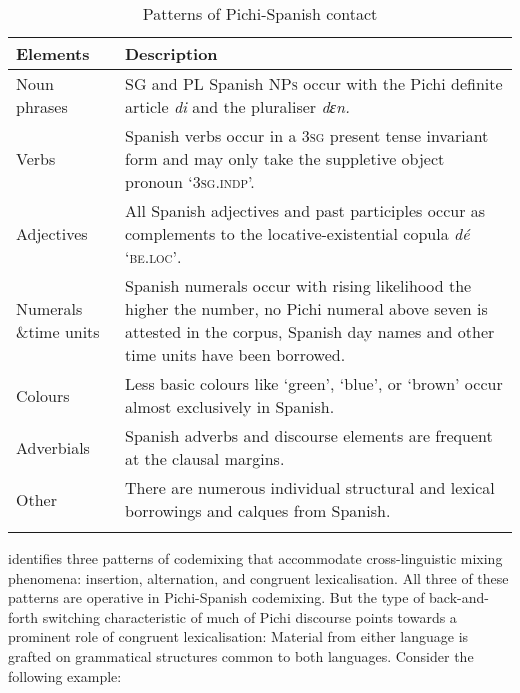 \begin{table}
\caption{Patterns of Pichi-Spanish contact}
\label{tab:key:13.1}

\begin{tabularx}{\textwidth}{p{22mm}Q}
\lsptoprule

Elements & Description\\
\midrule
Noun phrases & \textsc{SG} and \textsc{PL} Spanish \textsc{NPs} occur with the Pichi definite article \textit{di} and the pluraliser \textit{dɛn.}\\

\tablevspace
Verbs & Spanish verbs occur in a \textsc{3sg} present tense invariant form and may only take the suppletive object pronoun  ‘\textsc{3sg.indp}’.\\

\tablevspace
Adjectives & All Spanish adjectives and past participles occur as complements to the locative-existential copula \textit{dé} ‘\textsc{be.loc’}.\\

\tablevspace
Numerals \&\newline time units & Spanish numerals occur with rising likelihood the higher the number, no Pichi numeral above seven is attested in the corpus, Spanish day names and other time units have been borrowed.\\

\tablevspace
Colours & Less basic colours like ‘green’, ‘blue’, or ‘brown’ occur almost exclusively in Spanish.\\

\tablevspace
Adverbials & Spanish adverbs and discourse elements are frequent at the clausal margins.\\

\tablevspace
Other & There are numerous individual structural and lexical borrowings and calques from Spanish.\\
\lspbottomrule
\end{tabularx}
\end{table}

\citet{Muysken2000} identifies three patterns of codemixing that accommodate cross-linguistic mixing phenomena: insertion, alternation, and congruent lexicalisation. All three of these patterns are operative in Pichi-Spanish codemixing. But the type of back-and-forth switching characteristic of much of Pichi discourse points towards a prominent role of congruent lexicalisation: Material from either language is grafted on grammatical structures common to both languages. Consider the following example: 


